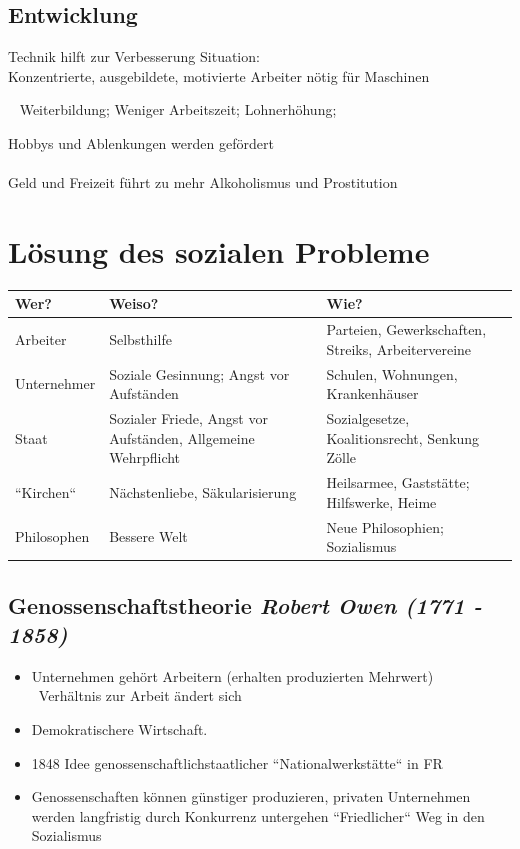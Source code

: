 \documentclass{report}
\begin{document}
\subsection{Entwicklung}
Technik hilft zur Verbesserung Situation:\\
Konzentrierte, ausgebildete, motivierte Arbeiter nötig für Maschinen\par
\arrow~ Weiterbildung; Weniger Arbeitszeit; Lohnerhöhung; \par Hobbys und Ablenkungen werden gefördert\\\\
Geld und Freizeit führt zu mehr Alkoholismus und Prostitution

\section{Lösung des sozialen Probleme}
\begin{tabular}{l | p{6cm} | p{8cm}}
\textbf{Wer?} & \textbf{Weiso?} & \textbf{Wie?} \\\hline
Arbeiter & Selbsthilfe & Parteien, Gewerkschaften, Streiks, Arbeitervereine \\\hline
Unternehmer & Soziale Gesinnung; Angst vor Aufständen & Schulen, Wohnungen, Krankenhäuser\\\hline
Staat & Sozialer Friede, Angst vor Aufständen, Allgemeine Wehrpflicht & Sozialgesetze, Koalitionsrecht, Senkung Zölle \\\hline
``Kirchen`` & Nächstenliebe, Säkularisierung & Heilsarmee, Gaststätte; Hilfswerke, Heime \\\hline
Philosophen & Bessere Welt & Neue Philosophien; Sozialismus
\end{tabular}

\subsection{Genossenschaftstheorie \rm{\textit{Robert Owen (1771 - 1858)}}}
\begin{itemize}
	\item Unternehmen gehört Arbeitern (erhalten produzierten Mehrwert)\\
	\arrow~Verhältnis zur Arbeit ändert sich
	\item Demokratischere Wirtschaft.
	\item 1848 Idee genossenschaftlichstaatlicher ``Nationalwerkstätte`` in FR
	\item Genossenschaften können günstiger produzieren, privaten Unternehmen werden langfristig durch Konkurrenz untergehen
``Friedlicher`` Weg in den Sozialismus
\end{itemize}
\end{document}
